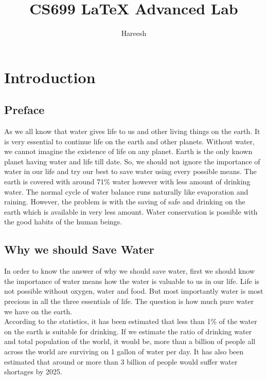 \documentclass{article}
\title{\textbf{ CS699 LaTeX Advanced Lab}}
\author{ Hareesh }
\begin{document}
\maketitle
\newpage

\tableofcontents
\newpage


\section{Introduction}
\subsection{Preface}

\hspace{1cm} As we all know that water gives life to us and other living things on the earth. It is very essential to continue life on the earth and other planets. Without water, we cannot imagine the existence of life on any planet. Earth is the only known planet having water and life till date. So, we should not ignore the importance of water in our life and try our best to save water using every possible means. The earth is covered with around 71\% water however with less amount of drinking water. The normal cycle of water balance runs naturally like evaporation and raining. However, the problem is with the saving of safe and drinking on the earth which is available in very less amount. Water conservation is possible with the good habits of the human beings.

\subsection{Why we should Save Water}
\hspace{1cm}In order to know the answer of why we should save water, first we should know the importance of water means how the water is valuable to us in our life. Life is not possible without oxygen, water and food. But most importantly water is most precious in all the three essentials of life. The question is how much pure water we have on the earth.\\
\hspace{1cm}According to the statistics, it has been estimated that less than 1\% of the water on the earth is suitable for drinking. If we estimate the ratio of drinking water and total population of the world, it would be, more than a billion of people all across the world are surviving on 1 gallon of water per day. It has also been estimated that around or more than 3 billion of people would suffer water shortages by 2025.
\end{document}
